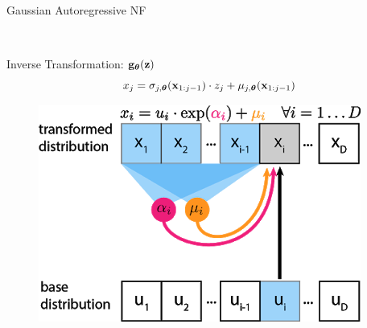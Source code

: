 \documentclass{beamer}
\begin{document}
\begin{frame}{Gaussian Autoregressive NF}
\begin{minipage}[t]{0.35\columnwidth}
\begin{figure}[h]
		\end{figure}
	\end{minipage} \\
	\eqpause
	\begin{minipage}[t]{0.65\columnwidth}
		\begin{block}{Inverse Transformation: $\mathbf{g}_{\boldsymbol{\theta}}(\mathbf{z})$}
			\vspace{-0.5cm}
			\[
				x_j = \sigma_{j, \boldsymbol{\theta}} (\mathbf{x}_{1:j-1}) \cdot z_j + \mu_{j, \boldsymbol{\theta}}(\mathbf{x}_{1:j-1})
			\]
		\end{block}
	\end{minipage}%
	\begin{minipage}[t]{0.35\columnwidth}
		\begin{figure}[h]
			\centering
			\includegraphics[width=.9\linewidth]{figs/af_iaf_explained_1.png}
		\end{figure}
	\end{minipage}
\end{frame}
\end{document}
